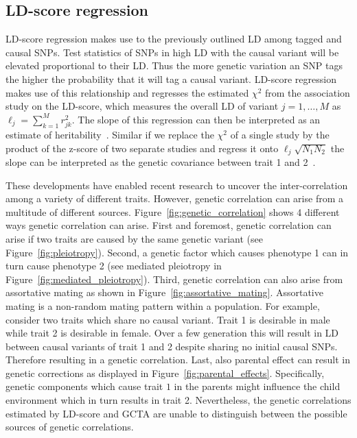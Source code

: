 \documentclass[../header.tex]{subfiles}
\begin{document}
\subsection{LD-score regression}
\label{sub:ld_score_regression}

LD-score regression makes use to the previously outlined LD among tagged and causal SNPs.
Test statistics of SNPs in high LD with the causal variant will be elevated proportional to their LD\@.
Thus the more genetic variation an SNP tags the higher the probability that it will tag a causal variant.
LD-score regression makes use of this relationship and regresses the estimated $\chi^2$ from the association study on the LD-score, which measures the overall LD of variant $j = 1, \ldots, M$ as $\ell_j = \sum^M_{k=1} r^2_{jk}$. 
The slope of this regression can then be interpreted as an estimate of heritability~\cite{Bulik-Sullivan2015}.
Similar if we replace the $\chi^2$ of a single study by the product of the z-score of two separate studies and regress it onto $\ell_j \sqrt{N_{1}N_{2}}$ the slope can be interpreted as the genetic covariance between trait 1 and 2~\cite{Bulik-Sullivan2015a}.

These developments have enabled recent research to uncover the inter-correlation among a variety of different traits.
However, genetic correlation can arise from a multitude of different sources.
Figure~\ref{fig:genetic_correlation} shows 4 different ways genetic correlation can arise.
First and foremost, genetic correlation can arise if two traits are caused by the same genetic variant (see Figure~\ref{fig:pleiotropy}).
Second, a genetic factor which causes phenotype 1 can in turn cause phenotype 2 (see mediated pleiotropy in Figure~\ref{fig:mediated_pleiotropy}).
Third, genetic correlation can also arise from assortative mating as shown in Figure~\ref{fig:assortative_mating}.
Assortative mating is a non-random mating pattern within a population.
For example, consider two traits which share no causal variant.
Trait 1 is desirable in male while trait 2 is desirable in female.
Over a few generation this will result in LD between causal variants of trait 1 and 2 despite sharing no initial causal SNPs.
Therefore resulting in a genetic correlation. 
Last, also parental effect can result in genetic corrections as displayed in Figure~\ref{fig:parental_effects}.
Specifically, genetic components which cause trait $1$ in the parents might influence the child environment which in turn results in trait 2. 
Nevertheless, the genetic correlations estimated by LD-score and GCTA are unable to distinguish between the possible sources of genetic correlations.
\end{document}
